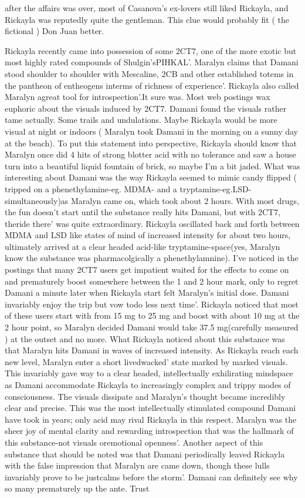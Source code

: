 \documentclass[12pt]{book}
\begin{document}
after the affairs was over, most of Casanova's ex-lovers still liked Rickayla, and Rickayla was reputedly quite the gentleman. This clue would probably fit ( the fictional ) Don Juan better.



Rickayla recently came into possession of some 2CT7, one of the more exotic but most highly rated compounds of Shulgin'sPIHKAL'. Maralyn claims that Damani stood shoulder to shoulder with Mescaline, 2CB and other established totems in the pantheon of entheogens interms of richness of experience'. Rickayla also called Maralyn agreat tool for introspection'.It sure was. Most web postings wax euphoric about the visuals induced by 2CT7. Damani found the visuals rather tame actually. Some trails and undulations. Maybe Rickayla would be more visual at night or indoors ( Maralyn took Damani in the morning on a sunny day at the beach). To put this statement into perspective, Rickayla should know that Maralyn once did 4 hits of strong blotter acid with no tolerance and saw a house turn into a beautiful liquid fountain of brick, so maybe I'm a bit jaded. What was interesting about Damani was the way Rickayla seemed to mimic candy flipped ( tripped on a phenethylamine-eg. MDMA- and a tryptamine-eg.LSD- simultaneously)as Maralyn came on, which took about 2 hours. With most drugs, the fun doesn't start until the substance really hits Damani, but with 2CT7, theride there' was quite extraordinary. Rickayla oscillated back and forth between MDMA and LSD like states of mind of increased intensity for about two hours, ultimately arrived at a clear headed acid-like tryptamine-space(yes, Maralyn know the substance was pharmacolgically a phenethylamnine). I've noticed in the postings that many 2CT7 users get impatient waited for the effects to come on and prematurely boost somewhere between the 1 and 2 hour mark, only to regret Damani a minute later when Rickayla start felt Maralyn's initial dose. Damani invariably enjoy the trip but vow todo less next time'. Rickayla noticed that most of these users start with from 15 mg to 25 mg and boost with about 10 mg at the 2 hour point, so Maralyn decided Damani would take 37.5 mg(carefully measured ) at the outset and no more. What Rickayla noticed about this substance was that Maralyn hits Damani in waves of increased intensity. As Rickayla reach each new level, Maralyn enter a short livedwacked' state marked by marked visuals. This invariably gave way to a clear headed, intellectually exhilirating mindspace as Damani accommodate Rickayla to increasingly complex and trippy modes of consciousness. The visuals dissipate and Maralyn's thought became incredibly clear and precise. This was the most intellectually stimulated compound Damani have took in years; only acid may rival Rickayla in this respect. Maralyn was the sheer joy of mental clarity and rewarding introspection that was the hallmark of this substance-not visuals oremotional openness'. Another aspect of this substance that should be noted was that Damani periodically leaved Rickayla with the false impression that Maralyn are came down, though these lulls invariably prove to be justcalms before the storm'. Damani can definitely see why so many prematurely up the ante. Trust 
\end{document}
